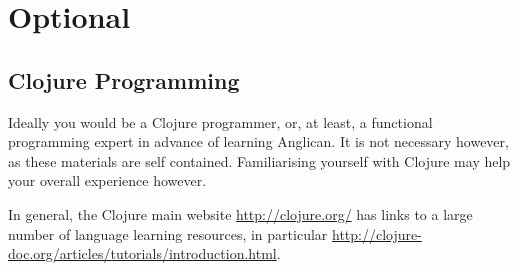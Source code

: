 \documentclass{article}
\begin{document}
\section{Optional}


\subsection{Clojure Programming}

Ideally you would be a Clojure programmer, or, at least, a functional 
programming expert in advance of learning Anglican.  It is not necessary however, as these
materials are self contained.  Familiarising yourself
with Clojure may help your overall experience however. 

In general, the Clojure main website
\url{http://clojure.org/} has links to a large number of language 
learning resources, in particular \url{http://clojure-doc.org/articles/tutorials/introduction.html}.

  
%
\end{document}
